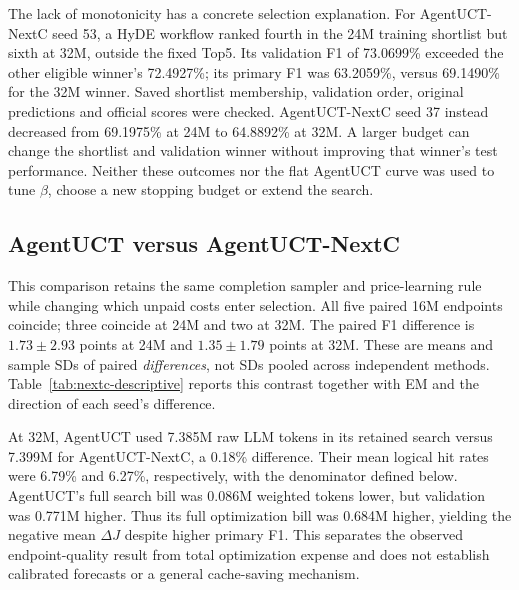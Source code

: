 The lack of monotonicity has a concrete selection explanation. For
AgentUCT-NextC seed 53, a HyDE workflow ranked fourth in the 24M training
shortlist but sixth at 32M, outside the fixed Top5. Its validation F1 of
73.0699\% exceeded the other eligible winner's 72.4927\%; its primary F1 was
63.2059\%, versus 69.1490\% for the 32M winner. Saved shortlist membership,
validation order, original predictions and official scores were checked.
AgentUCT-NextC seed 37 instead decreased from 69.1975\% at 24M to 64.8892\%
at 32M. A larger budget can change the shortlist and validation winner without
improving that winner's test performance. Neither these outcomes nor the flat
AgentUCT curve was used to tune $\beta$, choose a new stopping budget or
extend the search.

\subsection{AgentUCT versus AgentUCT-NextC}
\label{sec:nextc-detail}
This comparison retains the same completion sampler and price-learning rule
while changing which unpaid costs enter selection. All five paired 16M
endpoints coincide; three coincide at 24M and two at 32M.
The paired F1 difference is $1.73\pm2.93$ points at 24M and
$1.35\pm1.79$ points at 32M. These are means and sample SDs of paired
\emph{differences}, not SDs pooled across independent methods.
Table~\ref{tab:nextc-descriptive} reports this contrast together with EM
and the direction of each seed's difference.

At 32M, AgentUCT used 7.385M raw LLM tokens in its retained search versus
7.399M for AgentUCT-NextC, a 0.18\% difference. Their mean logical hit rates
were 6.79\% and 6.27\%, respectively, with the denominator defined below.
AgentUCT's full search bill was 0.086M weighted tokens lower, but validation
was 0.771M higher. Thus its full optimization bill was 0.684M higher, yielding
the negative mean $\Delta J$ despite higher primary F1. This separates the
observed endpoint-quality result from total optimization expense and does not
establish calibrated forecasts or a general cache-saving mechanism.

\begin{table}[htbp]
\centering\small
\caption{AgentUCT minus AgentUCT-NextC. Differences and their sample SDs
are in percentage points across five paired seeds. W/T/L counts positive,
zero and negative differences; the same rows appear in
Table~\ref{tab:budget-descriptive}.}
\label{tab:nextc-descriptive}

\end{table}
\begin{table}[htbp]
\centering\small\setlength{\tabcolsep}{3pt}
\caption{All paired budget comparisons, AgentUCT minus each baseline.
Differences and sample SDs are in percentage points over five seeds.
W/T/L gives the numbers of seed-level wins, ties and losses. F1 is primary
and EM auxiliary.}
\label{tab:budget-descriptive}

\end{table}

